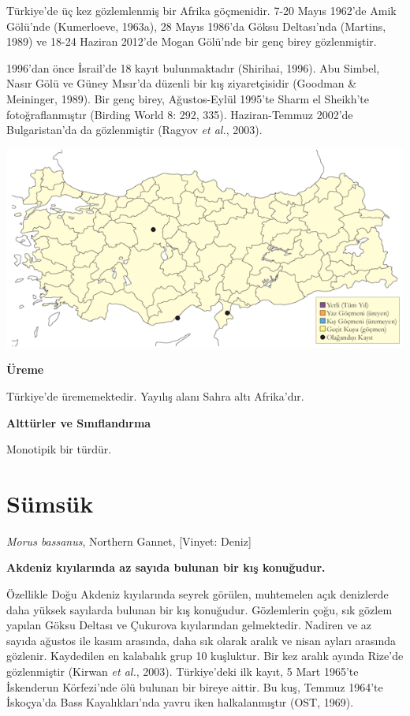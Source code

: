 \documentclass[
  a4paper,
  DIV=11,
  numbers=noendperiod]{scrreprt}
\begin{document}
Türkiye'de üç kez gözlemlenmiş bir Afrika göçmenidir. 7-20 Mayıs 1962'de
Amik Gölü'nde (Kumerloeve, 1963a), 28 Mayıs 1986'da Göksu Deltası'nda
(Martins, 1989) ve 18-24 Haziran 2012'de Mogan Gölü'nde bir genç birey
gözlenmiştir.

1996'dan önce İsrail'de 18 kayıt bulunmaktadır (Shirihai, 1996). Abu
Simbel, Nasır Gölü ve Güney Mısır'da düzenli bir kış ziyaretçisidir
(Goodman \& Meininger, 1989). Bir genç birey, Ağustos-Eylül 1995'te
Sharm el Sheikh'te fotoğraflanmıştır (Birding World 8: 292, 335).
Haziran-Temmuz 2002'de Bulgaristan'da da gözlenmiştir (Ragyov \emph{et
al.}, 2003).

\includegraphics{images/harita_Page_058.png}

\textbf{Üreme}

Türkiye'de ürememektedir. Yayılış alanı Sahra altı Afrika'dır.

\textbf{Alttürler ve Sınıflandırma}

Monotipik bir türdür.

\section{Sümsük}\label{suxfcmsuxfck}

\emph{Morus bassanus}, Northern Gannet, {[}Vinyet: Deniz{]}

\textbf{Akdeniz kıyılarında az sayıda bulunan bir kış konuğudur.}

Özellikle Doğu Akdeniz kıyılarında seyrek görülen, muhtemelen açık
denizlerde daha yüksek sayılarda bulunan bir kış konuğudur. Gözlemlerin
çoğu, sık gözlem yapılan Göksu Deltası ve Çukurova kıyılarından
gelmektedir. Nadiren ve az sayıda ağustos ile kasım arasında, daha sık
olarak aralık ve nisan ayları arasında gözlenir. Kaydedilen en kalabalık
grup 10 kuşluktur. Bir kez aralık ayında Rize'de gözlenmiştir (Kirwan
\emph{et al.}, 2003). Türkiye'deki ilk kayıt, 5 Mart 1965'te İskenderun
Körfezi'nde ölü bulunan bir bireye aittir. Bu kuş, Temmuz 1964'te
İskoçya'da Bass Kayalıkları'nda yavru iken halkalanmıştır (OST, 1969).
\end{document}
